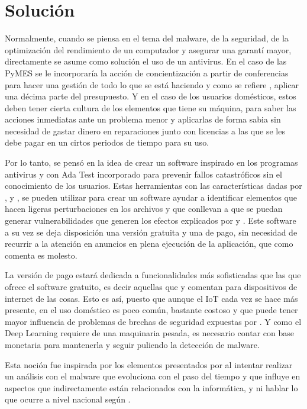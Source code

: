 \pagebreak
\section{Solución}

Normalmente, cuando se piensa en el tema del malware, de la seguridad, de la
optimización del rendimiento de un computador y asegurar una garantí mayor,
directamente se asume como solución el uso de un antivirus. En el caso de las
PyMES se le incorporaría la acción de concientización a partir de conferencias
para hacer una gestión de todo lo que se está haciendo y como se refiere
\textcite{Bueno2022}, aplicar una décima parte del presupuesto. Y en el caso de
los usuarios domésticos, estos deben tener cierta cultura de los elementos que
tiene su máquina, para saber las acciones inmediatas ante un problema menor y
aplicarlas de forma sabia sin necesidad de gastar dinero en reparaciones junto
con licencias a las que se les debe pagar en un cirtos periodos de tiempo para
su uso.

Por lo tanto, se pensó en la idea de crear un software inspirado en los
programas antivirus y con Ada Test incorporado para prevenir fallos
catastróficos sin el conocimiento de los usuarios. Estas herramientas con las
características dadas por \textcite{Chen2023}, \textcite{Ortiz2024} y
\textcite{Zailani2021}, se pueden utilizar para crear un software ayudar a
identificar elementos que hacen ligeras perturbaciones en los archivos y que
conllevan a que se puedan generar vulnerabilidades que generen los efectos
explicados por \textcite{Mosquera2019} y \textcite{Rosli2019}. Este software a
su vez se deja disposición una versión gratuita y una de pago, sin necesidad de
recurrir a la atención en anuncios en plena ejecución de la aplicación, que
como comenta \textcite{Hartl2023} es molesto. 

La versión de pago estará dedicada a funcionalidades más sofisticadas que las
que ofrece el software gratuito, es decir aquellas que \textcite{Singh2022} y
\textcite{Waqar2023} comentan para dispositivos de internet de las cosas.
Esto es así, puesto que aunque el IoT cada vez se hace más presente, en el uso
doméstico es poco común, bastante costoso y que puede tener mayor influencia
de problemas de brechas de seguridad expuestas por \textcite{Rosli2019}. Y como
el Deep Learning requiere de una maquinaria pesada, es necesario contar con
base monetaria para mantenerla y seguir puliendo la detección de malware.

Esta noción fue inspirada por los elementos presentados por
\textcite{Aboaoja2022} al intentar realizar un análisis con el malware que
evoluciona con el paso del tiempo y que influye en aspectos que indirectamente
están relacionados con la informática, y ni hablar lo que ocurre a nivel
nacional según \textcite{CanoMartinez2022}.

